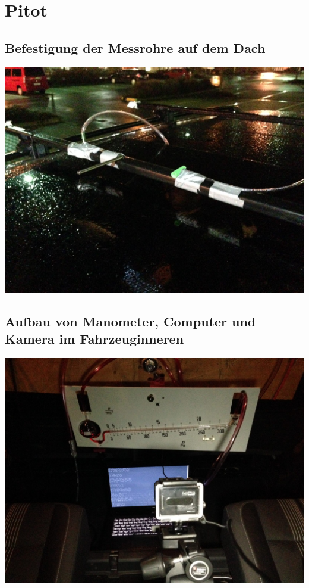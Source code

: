 \section{Pitot}
\subsection*{Befestigung der Messrohre auf dem Dach}
\begin{frame}
	\includegraphics[width=\textwidth]{images/3/IMG_0004}
\end{frame}
\subsection*{Aufbau von Manometer, Computer und Kamera im Fahrzeuginneren}
\begin{frame}
	\includegraphics[width=\textwidth]{images/3/IMG_0007}
\end{frame}

